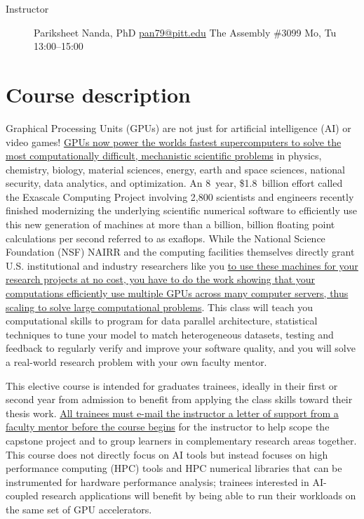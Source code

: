 \documentclass[12pt]{article}
\begin{document}


\begin{description}
\item[Instructor] Pariksheet Nanda, PhD \quad %
  \href{mailto:pan79@pitt.edu}{pan79@pitt.edu} \quad %
  The Assembly \#3099 \quad %
  Mo, Tu 13:00--15:00
\end{description}

\section{Course description}

Graphical Processing Units (GPUs) %
are not just for artificial intelligence (AI) or %
video games!
%
\ul{GPUs now power the worlds fastest supercomputers %
to solve the most computationally difficult, %
mechanistic scientific problems} in %
physics, %
chemistry, %
biology, %
material sciences, %
energy, %
earth and space sciences, %
national security, %
data analytics, and %
optimization.
%
An 8~year, \$1.8~billion effort %
called the Exascale Computing Project %
involving 2,800 scientists and engineers %
recently finished modernizing %
the underlying scientific numerical software %
to efficiently use this new generation of machines %
at more than a billion, billion floating point calculations per second %
referred to as exaflops.
%
While the National Science Foundation (NSF) NAIRR %
and the computing facilities themselves directly grant %
U.S. institutional and industry researchers like you %
\ul{to use these machines for your research projects at no cost, %
you have to do the work showing that %
your computations efficiently use %
multiple GPUs across many computer servers, %
thus scaling to solve large computational problems}.
%
This class will teach you %
computational skills to program for data parallel architecture, %
statistical techniques to tune your model to match heterogeneous datasets, %
testing and feedback %
to regularly verify and improve your software quality, %
and you will solve a real-world research problem with your own faculty mentor.

This elective course is intended for %
graduates trainees, %
ideally in their first or second year from admission %
to benefit from applying the class skills %
toward their thesis work.
%
\ul{All trainees %
must e-mail the instructor a letter of support from a faculty mentor %
before the course begins} %
for the instructor to help scope the capstone project %
and to group learners in complementary research areas together.
%
This course does not directly focus on AI tools %
but instead focuses on high performance computing (HPC) tools %
and HPC numerical libraries %
that can be instrumented for hardware performance analysis;
trainees interested in AI-coupled research applications %
will benefit by being able to run their workloads %
on the same set of GPU accelerators.
\end{document}
